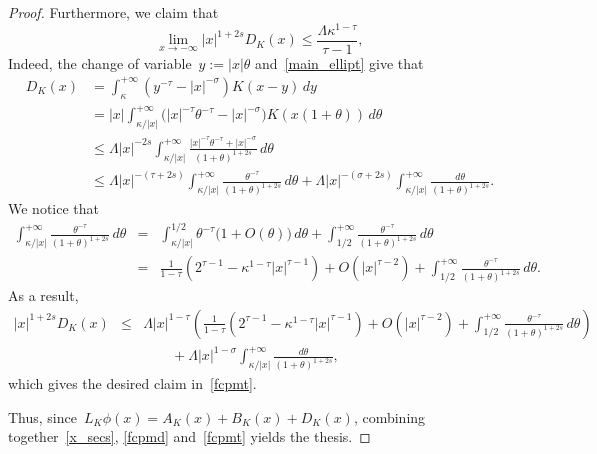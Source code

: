 \documentclass[10pt,a4paper]{amsart}
\begin{document}
\begin{proof}
Furthermore, we claim that
\begin{equation}\label{fcpmt}
\lim_{x \to - \infty} |x |^{1+2s} D_K(x) \leq  \frac{\Lambda\kappa^{1-\tau}}{\tau-1},
\end{equation}
Indeed, the change of variable~$y:=|x|\theta$ 
and~\eqref{main_ellipt} give that
\begin{equation*}
\begin{split}
D_K(x)&= \int_{\kappa}^{+\infty} (y^{-\tau} - |x |^{-\sigma})K(x-y) \, dy \\
&= |x |\int_{{\kappa}/{|x|}}^{+\infty}\big(
|x |^{-\tau} \theta^{-\tau} - |x |^{-\sigma}\big) K(x (1+\theta))\, d\theta\\
&\leq \Lambda |x |^{-2s} \int_{{\kappa}/{|x|}}^{+\infty} \frac{|x |^{-\tau} \theta^{-\tau} +|x |^{-\sigma}}{(1+\theta)^{1+2s}}\, d\theta\\
&\leq  \Lambda |x |^{-(\tau+2s)} 
\int_{{\kappa}/{|x|}}^{+\infty}  \frac{\theta^{-\tau}}{(1+\theta)^{1+2s}}\, d\theta
+\Lambda | x |^{-(\sigma+2s)}
\int_{{\kappa}/{| x|}}^{+\infty} \frac{d\theta}{(1+\theta)^{1+2s}}.
\end{split}\end{equation*}
We notice that
\begin{eqnarray*}
\int_{{\kappa}/{|x|}}^{+\infty}  \frac{\theta^{-\tau}}{(1+\theta)^{1+2s}}\, d\theta
&=&\int_{{\kappa}/{|x|}}^{1/2}
\theta^{-\tau}\big(1+O(\theta)\big)\, d\theta
+ \int_{1/2}^{+\infty}  \frac{\theta^{-\tau}}{(1+\theta)^{1+2s}}\, d\theta\\
&=&\frac{1}{1-\tau}\left( 2^{\tau-1}-\kappa^{1-\tau}|x|^{\tau-1}
\right) + O(|x|^{\tau-2})
+ \int_{1/2}^{+\infty}  \frac{\theta^{-\tau}}{(1+\theta)^{1+2s}}\, d\theta.
\end{eqnarray*}
As a result,
\begin{eqnarray*}
|x|^{1+2s}D_K(x)&\le& 
\Lambda|x|^{1-\tau}\left(\frac{1}{1-\tau}\left( 2^{\tau-1}-\kappa^{1-\tau}|x|^{\tau-1}
\right) + O(|x|^{\tau-2})
+ \int_{1/2}^{+\infty}  \frac{\theta^{-\tau}}{(1+\theta)^{1+2s}}\, d\theta\right)\\&&\qquad
+\Lambda |x |^{1-\sigma}
\int_{{\kappa}/{|x|}}^{+\infty} \frac{d\theta}{(1+\theta)^{1+2s}},
\end{eqnarray*}
which gives the desired claim in~\eqref{fcpmt}.

Thus, since~$L_K\phi(x)= A_K(x) + B_K(x) + D_K(x)$,
combining together~\eqref{x_secs}, \eqref{fcpmd} and~\eqref{fcpmt} yields the thesis.
\end{proof}    
\end{document}
